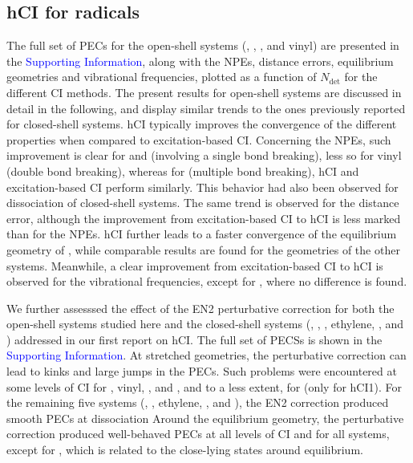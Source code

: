 \documentclass[aip,jcp,reprint,noshowkeys,superscriptaddress]{revtex4-1}
\newcommand{\SupInf}{\textcolor{blue}{Supporting Information}}
\newcommand{\Ndet}{N_\text{det}}
\begin{document}
\subsection{hCI for radicals}
\label{sec:res_A}


The full set of PECs for the open-shell systems (, , , and vinyl) are presented in the {\SupInf},
along with the NPEs, distance errors, equilibrium geometries and vibrational frequencies, plotted as a function of $\Ndet$ for the different CI methods.
The present results for open-shell systems are discussed in detail in the following,
and display similar trends to the ones previously reported for closed-shell systems. \cite{Kossoski_2022}
hCI typically improves the convergence of the different properties when compared to excitation-based CI.
Concerning the NPEs, such improvement is clear for  and  (involving a single bond breaking), less so for vinyl (double bond breaking),
whereas for  (multiple bond breaking), hCI and excitation-based CI perform similarly.
This behavior had also been observed for dissociation of closed-shell systems. \cite{Kossoski_2022}
The same trend is observed for the distance error, although the improvement from excitation-based CI to hCI is less marked than for the NPEs.
hCI further leads to a faster convergence of the equilibrium geometry of , while comparable results are found for the geometries of the other systems.
Meanwhile, a clear improvement from excitation-based CI to hCI is observed for the vibrational frequencies, except for , where no difference is found.



We further assesssed the effect of the EN2 perturbative correction for both the open-shell systems studied here 
and the closed-shell systems (, , , ethylene, , and ) addressed in our first report on hCI. \cite{Kossoski_2022}
The full set of PECSs is shown in the {\SupInf}.
At stretched geometries, the perturbative correction can lead to kinks and large jumps in the PECs.
Such problems were encountered at some levels of CI for , vinyl, , and , and to a less extent, for  (only for hCI1).
For the remaining five systems (, , ethylene, , and ),
the EN2 correction produced smooth PECs at dissociation
Around the equilibrium geometry, the perturbative correction produced well-behaved PECs at all levels of CI and for all systems, except for ,
which is related to the close-lying states around equilibrium.
\end{document}

